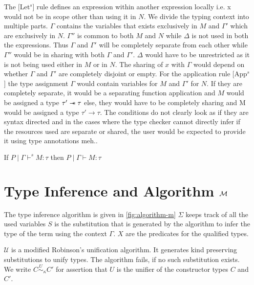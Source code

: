 The [Let$^s$] rule defines an expression within another expression locally i.e. x would
not be in scope other than using it in $N$. We divide the typing context into multiple parts.
$\Gamma$ contains the variables that exists exclusively in $M$ and $\Gamma'$ which
are exclusively in $N$. $\Gamma''$ is common to both $M$ and $N$ while $\Delta$ is not used in both the expressions.
Thus $\Gamma$ and $\Gamma'$ will be completely separate from each other while $\Gamma''$ would be in sharing with both $\Gamma$ and $\Gamma'$.
$\Delta$ would have to be unrestricted as it is not being used either in $M$ or in $N$. The sharing of $x$ with $\Gamma$ would depend on
whether $\Gamma$ and $\Gamma'$ are completely disjoint or empty. For the application rule [App$^s$] the type assignment $\Gamma$ would contain
variables for $M$ and $\Gamma'$ for $N$. If they are completely separate, it would be a separating function application and $M$ would be
assigned a type $\tau' \mathrel{-\mkern-6mu*} \tau$ else, they would have to be completely sharing and M would be assigned a type $\tau' \rightarrow \tau$.
The conditions do not clearly look as if they are syntax directed and in the cases where the type checker cannot directly infer if the
resources used are separate or shared, the user would be expected to provide it using type annotations  {\color{red} meh.}.

\begin{thm}
  If $P \mid \Gamma \vdash^s M:\tau$ then $P \mid \Gamma \vdash M : \tau$
\end{thm}

\section{Type Inference and Algorithm $\mathcal{M}$}\label{sec:algorithm-m}
The type inference algorithm is given in \cref{fig:algorithm-m}
$\Sigma$ keeps track of all the used variables
$S$ is the substitution that is generated by the algorithm to infer the type of the
term using the context $\Gamma$. $X$ are the predicates for the qualified types.

$\mathcal{U}$ is a modified Robinson's \citeyearpar{robinson_machine-oriented_1965} unification algorithm.
It generates kind preserving substitutions to unify types. The algorithm fails, if no such substitution exists.
We write $C \overset{U}{\sim}_{\kappa} C'$ for assertion that $U$ is the unifier
of the constructor types $C$ and $C'$.

